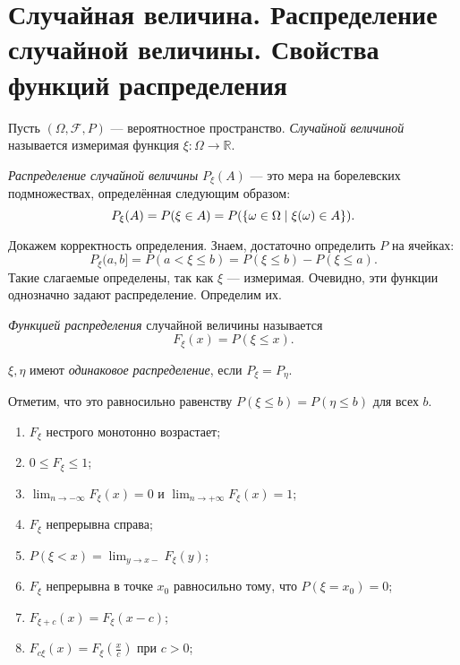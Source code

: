 \section{Случайная величина. Распределение случайной величины. Свойства функций распределения}

\begin{definition}
    Пусть $(\Omega, \mathcal{F}, P) $ --- вероятностное пространство.
    \textit{Случайной величиной} называется измеримая функция $\xi\colon \Omega \rightarrow \mathbb{R}$.
\end{definition}


\begin{definition}\textit{Распределение случайной величины} $P_\xi(A)$ --- это мера на борелевских подмножествах, определённая следующим образом:
    $$P_\xi(A) = P(\xi \in A) =  P(\{\omega\in\Omega\mid \xi(\omega) \in A\}).$$
\end{definition}

Докажем корректность определения. Знаем, достаточно определить $P$ на ячейках: 
$$P_\xi(a, b] = P(a < \xi \le b) =
        P(\xi \le b) - P(\xi\le a).$$
Такие слагаемые определены, так как $\xi$ --- измеримая. Очевидно, эти функции однозначно задают распределение. Определим их.

\begin{definition} \textit{Функцией распределения} случайной величины называется 
    $$F_\xi(x) = P(\xi\le x).$$
\end{definition}

\begin{definition}
    $\xi, \eta$ имеют \textit{одинаковое распределение}, если $P_\xi = P_\eta$.
\end{definition}

Отметим, что это равносильно равенству $P(\xi \le b) = P(\eta \le b)$  для всех $b$.

\begin{properties}
\enewline
    \begin{enumerate}
        \item $F_\xi$ нестрого монотонно возрастает;
        \item $0\le F_\xi \le 1$;
        \item ${\lim}_{n\rightarrow -\infty} F_\xi (x) = 0$ и ${\lim}_{n\rightarrow +\infty} F_\xi (x) = 1$;
        \item $F_\xi$ непрерывна справа;
        \item $P(\xi < x) = {\lim}_{y\rightarrow x-}  F_\xi(y)$;
        \item $F_\xi$ непрерывна в точке $x_0$ равносильно тому, что $P(\xi = x_0) = 0$;
        \item $F_{\xi + c} (x) = F_\xi (x - c)$;
        \item $F_{c\xi} (x) = F_\xi(\frac{x}{c})$ при  $c > 0$; \qedhere
    \end{enumerate}
\end{properties}

